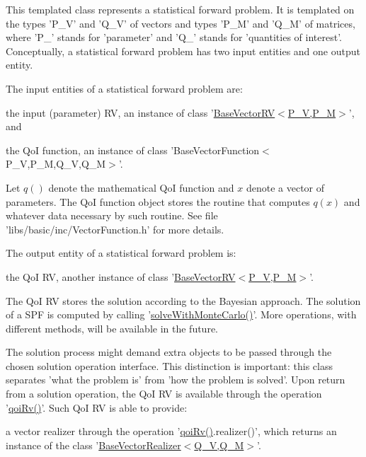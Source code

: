 This templated class represents a statistical forward problem. It is templated on the types 'P\-\_\-\-V' and 'Q\-\_\-\-V' of vectors and types 'P\-\_\-\-M' and 'Q\-\_\-\-M' of matrices, where 'P\-\_\-' stands for 'parameter' and 'Q\-\_\-' stands for 'quantities of interest'. Conceptually, a statistical forward problem has two input entities and one output entity.\par
 The input entities of a statistical forward problem are\-: 
\begin{DoxyEnumerate}
\item the input (parameter) R\-V, an instance of class '\hyperlink{class_q_u_e_s_o_1_1_base_vector_r_v}{Base\-Vector\-R\-V$<$\-P\-\_\-\-V,\-P\-\_\-\-M$>$}', and 
\item the Qo\-I function, an instance of class 'Base\-Vector\-Function$<$\-P\-\_\-\-V,\-P\-\_\-\-M,\-Q\-\_\-\-V,\-Q\-\_\-\-M$>$'. 
\end{DoxyEnumerate}Let $ q() $ denote the mathematical Qo\-I function and $ x $ denote a vector of parameters. The Qo\-I function object stores the routine that computes $ q(x) $ and whatever data necessary by such routine. See file 'libs/basic/inc/\-Vector\-Function.\-h' for more details.\par
 The output entity of a statistical forward problem is\-: 
\begin{DoxyEnumerate}
\item the Qo\-I R\-V, another instance of class '\hyperlink{class_q_u_e_s_o_1_1_base_vector_r_v}{Base\-Vector\-R\-V$<$\-P\-\_\-\-V,\-P\-\_\-\-M$>$}'. 
\end{DoxyEnumerate}The Qo\-I R\-V stores the solution according to the Bayesian approach. The solution of a S\-P\-F is computed by calling '\hyperlink{class_q_u_e_s_o_1_1_statistical_forward_problem_a523a6e2ac16dd949849bb7b46d98b842}{solve\-With\-Monte\-Carlo()}'. More operations, with different methods, will be available in the future.\par
 The solution process might demand extra objects to be passed through the chosen solution operation interface. This distinction is important\-: this class separates 'what the problem is' from 'how the problem is solved'. Upon return from a solution operation, the Qo\-I R\-V is available through the operation '\hyperlink{class_q_u_e_s_o_1_1_statistical_forward_problem_ae2aa8a443bec68b57342c3afc079356d}{qoi\-Rv()}'. Such Qo\-I R\-V is able to provide\-: 
\begin{DoxyEnumerate}
\item a vector realizer through the operation '\hyperlink{class_q_u_e_s_o_1_1_statistical_forward_problem_ae2aa8a443bec68b57342c3afc079356d}{qoi\-Rv()}.realizer()', which returns an instance of the class '\hyperlink{class_q_u_e_s_o_1_1_base_vector_realizer}{Base\-Vector\-Realizer$<$\-Q\-\_\-\-V,\-Q\-\_\-\-M$>$}'. 
\end{DoxyEnumerate}

